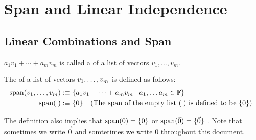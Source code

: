 \section{Span and Linear Independence}
\subsection{Linear Combinations and Span}

\setcounter{thm}{1}
\begin{mydef} 
  $a_1 v_1 + \cdots + a_m v_m$ is called a  of a list of vectors $v_1, \dots, v_m$.
\end{mydef}

\setcounter{thm}{3}
\begin{mydef} 
	The  of a list of vectors $v_1, \dots, v_m$ is defined as follows:
  \begin{equation}
    \begin{aligned}
      \operatorname{span} (v_1, \dots, v_m) &:\equiv \{a_1 v_1 + \cdots + a_m v_m \mid a_1, \dots a_m \in \mathbb{F} \}\\
      \operatorname{span} (\; ) &:\equiv \{ 0 \} \;\;\, \text{ (The span of the empty list $(\;)$ is defined to be $\{0\}$)}\;\;
    \end{aligned}
  \end{equation}

  The definition also implies that $\operatorname{span} ( 0) = \{0\}$ or $\operatorname{span} (\vec 0) = \{\vec 0\}$ . Note that sometimes we write $\vec 0$ and somtetimes we write $0$ throughout this document.
\end{mydef}

